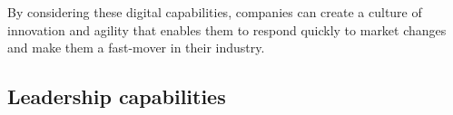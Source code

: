 \documentclass[a4]{scrartcl}
\begin{document}
	By considering these digital capabilities, companies can create a culture of innovation and agility that enables them to respond quickly to market changes and make them a fast-mover in their industry.
	
	
	
	
	
	
	
	
	\subsection{Leadership capabilities} \label{subsec:leadershipcapabilities}
	
	
	
	

	
	
	
	
	
	
	
	
\end{document}
